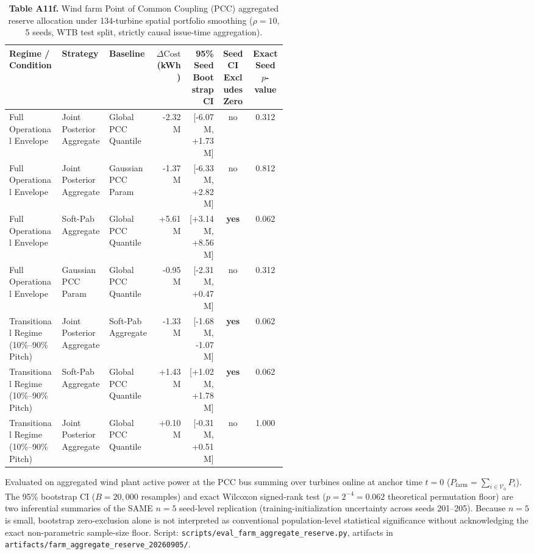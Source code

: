 \documentclass[
  journal]{IEEEtran}
\begin{document}
\begin{table}[!t]
\centering
\fontsize{8.0pt}{9.6pt}\selectfont
\setlength{\tabcolsep}{2.2pt}
\renewcommand{\arraystretch}{1.05}
\caption*{\textbf{Table A11f.} Wind farm Point of Common Coupling (PCC) aggregated reserve allocation under 134-turbine spatial portfolio smoothing ($\rho=10$, 5 seeds, WTB test split, strictly causal issue-time aggregation).}
%
\setlength{\tabcolsep}{2.5pt}
\begin{tabularx}{\linewidth}{>{\raggedright\arraybackslash}p{0.19\linewidth} >{\raggedright\arraybackslash}p{0.17\linewidth} >{\raggedright\arraybackslash}p{0.17\linewidth} r r c c}
\toprule
Regime / Condition & Strategy & Baseline & $\Delta\text{Cost}$ (kWh) & \shortstack{95\% Seed\\Bootstrap CI} & \shortstack{Seed CI\\Excludes Zero} & \shortstack{Exact Seed\\$p$-value} \\
\midrule
Full Operational Envelope & Joint Posterior Aggregate & Global PCC Quantile & -2.32M & [-6.07M, +1.73M] & no & 0.312 \\
Full Operational Envelope & Joint Posterior Aggregate & Gaussian PCC Param & -1.37M & [-6.33M, +2.82M] & no & 0.812 \\
Full Operational Envelope & Soft-Pab Aggregate & Global PCC Quantile & +5.61M & [+3.14M, +8.56M] & \textbf{yes} & 0.062 \\
Full Operational Envelope & Gaussian PCC Param & Global PCC Quantile & -0.95M & [-2.31M, +0.47M] & no & 0.312 \\
\midrule
Transitional Regime (10\%--90\% Pitch) & Joint Posterior Aggregate & Soft-Pab Aggregate & -1.33M & [-1.68M, -1.07M] & \textbf{yes} & 0.062 \\
Transitional Regime (10\%--90\% Pitch) & Soft-Pab Aggregate & Global PCC Quantile & +1.43M & [+1.02M, +1.78M] & \textbf{yes} & 0.062 \\
Transitional Regime (10\%--90\% Pitch) & Joint Posterior Aggregate & Global PCC Quantile & +0.10M & [-0.31M, +0.51M] & no & 1.000 \\
\bottomrule
\end{tabularx}\vspace{1mm}
\fontsize{8.0pt}{9.6pt}\selectfont Evaluated on aggregated wind plant active power at the PCC bus summing over turbines online at anchor time $t=0$ ($P_{\mathrm{farm}} = \sum_{i \in \mathcal{V}_0} P_i$). The 95\% bootstrap CI ($B=20{,}000$ resamples) and exact Wilcoxon signed-rank test ($p=2^{-4}=0.062$ theoretical permutation floor) are two inferential summaries of the SAME $n=5$ seed-level replication (training-initialization uncertainty across seeds 201--205). Because $n=5$ is small, bootstrap zero-exclusion alone is not interpreted as conventional population-level statistical significance without acknowledging the exact non-parametric sample-size floor. Script: \texttt{scripts/eval\_farm\_aggregate\_reserve.py}, artifacts in \texttt{artifacts/farm\_aggregate\_reserve\_20260905/}.
\end{table}
\end{document}
